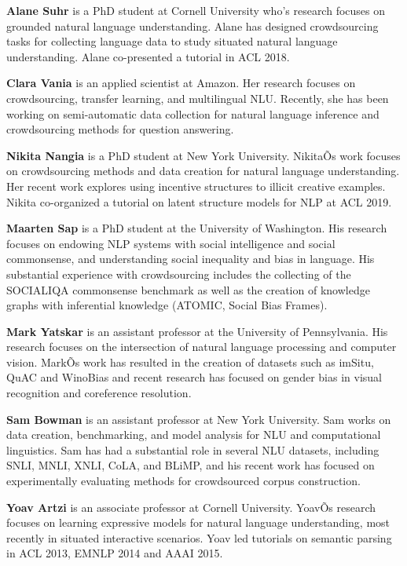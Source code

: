 \begin{bio}
  {\bfseries Alane Suhr} is a PhD student at Cornell University who's research focuses on grounded natural language understanding. Alane has designed crowdsourcing tasks for collecting language data to study situated natural language understanding. Alane co-presented a tutorial in ACL 2018.

  {\bfseries Clara Vania} is an applied scientist at Amazon. Her research focuses on crowdsourcing, transfer learning, and multilingual NLU. Recently, she has been working on semi-automatic data collection for natural language inference and crowdsourcing methods for question answering.

  {\bfseries Nikita Nangia} is a PhD student at New York University. NikitaÕs work focuses on crowdsourcing methods and data creation for natural language understanding. Her recent work explores using incentive structures to illicit creative examples. Nikita co-organized a tutorial on latent structure models for NLP at ACL 2019.

    {\bfseries Maarten Sap} is a PhD student at the University of Washington.
His research focuses on endowing NLP systems with social intelligence and social commonsense, and understanding social inequality and bias in language. His substantial experience with crowdsourcing includes the collecting of the SOCIALIQA commonsense benchmark as well as the creation of knowledge graphs with inferential knowledge (ATOMIC, Social Bias Frames).

  {\bfseries Mark Yatskar} is an assistant professor at the University of Pennsylvania. His research focuses on the intersection of natural language processing and computer vision. MarkÕs work has resulted in the creation of datasets such as imSitu, QuAC and WinoBias and recent research has focused on gender bias in visual recognition and coreference resolution.

  {\bfseries Sam Bowman} is an assistant professor at New York University.
Sam works on data creation, benchmarking, and model analysis for NLU and computational linguistics. Sam has had a substantial role in several NLU datasets, including SNLI, MNLI, XNLI, CoLA, and BLiMP, and his recent work has focused on experimentally evaluating methods for crowdsourced corpus construction.

  {\bfseries Yoav Artzi} is an associate professor at Cornell University.
YoavÕs research focuses on learning expressive models for natural language understanding, most recently in situated interactive scenarios. Yoav led tutorials on semantic parsing in ACL 2013, EMNLP 2014 and AAAI 2015.

\end{bio}

